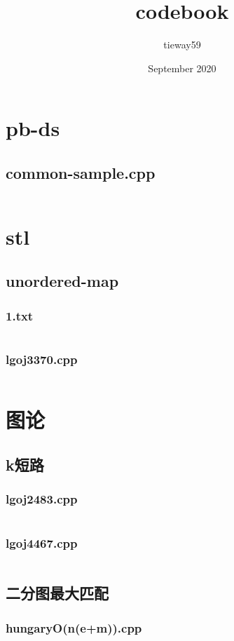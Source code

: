 \documentclass[a4paper,landscape,twocolumn]{article} %
\title{codebook}
\author{tieway59}
\date{September 2020}
\begin{document}

\begingroup
\let\onecolumn\twocolumn
\tableofcontents
\endgroup

\newpage

\section{pb-ds}
\subsection{common-sample.cpp}
\inputminted{c++}{./codes/000}
\section{stl}
\subsection{unordered-map}
\subsubsection{1.txt}
\inputminted{text}{./codes/001}
\subsubsection{lgoj3370.cpp}
\inputminted{c++}{./codes/002}
\section{图论}
\subsection{k短路}
\subsubsection{lgoj2483.cpp}
\inputminted{c++}{./codes/003}
\subsubsection{lgoj4467.cpp}
\inputminted{c++}{./codes/004}
\subsection{二分图最大匹配}
\subsubsection{hungaryO(n(e+m)).cpp}
\inputminted{c++}{./codes/005}
\end{document}

